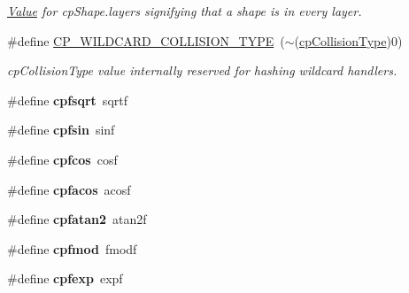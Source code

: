 \begin{DoxyCompactItemize}
\begin{DoxyCompactList}\small\item\em \hyperlink{classValue}{Value} for cp\+Shape.\+layers signifying that a shape is in every layer. \end{DoxyCompactList}\item 
\mbox{\label{group__basicTypes_ga3c81e881eb469ffacbe318a5a991c5bc}} 
\#define \hyperlink{group__basicTypes_ga3c81e881eb469ffacbe318a5a991c5bc}{C\+P\+\_\+\+W\+I\+L\+D\+C\+A\+R\+D\+\_\+\+C\+O\+L\+L\+I\+S\+I\+O\+N\+\_\+\+T\+Y\+PE}~($\sim$(\hyperlink{group__basicTypes_gae83e2f50965eb441e36ffff1e32e6d02}{cp\+Collision\+Type})0)
\begin{DoxyCompactList}\small\item\em cp\+Collision\+Type value internally reserved for hashing wildcard handlers. \end{DoxyCompactList}\item 
\mbox{\label{group__basicTypes_gad6a505ab629d04f2722b5bd02b080289}} 
\#define {\bfseries cpfsqrt}~sqrtf
\item 
\mbox{\label{group__basicTypes_ga91ad262063f562fe882c686038ade622}} 
\#define {\bfseries cpfsin}~sinf
\item 
\mbox{\label{group__basicTypes_gab24e29862e14b71d2cdd60d5ecf6dfb7}} 
\#define {\bfseries cpfcos}~cosf
\item 
\mbox{\label{group__basicTypes_gaa8cbcd374f1cf4ed859e1aeff42b1398}} 
\#define {\bfseries cpfacos}~acosf
\item 
\mbox{\label{group__basicTypes_gaeae19031d0e96da4f0f8ca5b0953ffff}} 
\#define {\bfseries cpfatan2}~atan2f
\item 
\mbox{\label{group__basicTypes_ga6874b96e60ba5336fd1866da8709aaf7}} 
\#define {\bfseries cpfmod}~fmodf
\item 
\mbox{\label{group__basicTypes_gac0b8bda3f5a346ff9479e82f2e1249ab}} 
\#define {\bfseries cpfexp}~expf
\item 
\mbox{\label{group__basicTypes_ga353aa33aa775a59fd98882b1c9e786d1}} 

\end{DoxyCompactItemize}
